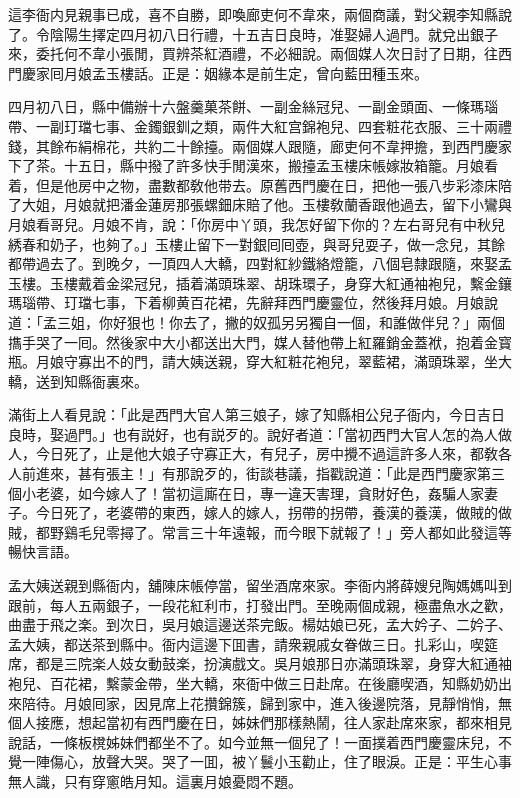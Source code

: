 這李衙内見親事已成，喜不自勝，即喚廊吏何不韋來，兩個商議，對父親李知縣說了。令陰陽生擇定四月初八日行禮，十五吉日良時，准娶婦人過門。就兌出銀子來，委托何不韋小張閒，買辨茶紅酒禮，不必細說。兩個媒人次日討了日期，往西門慶家囘月娘孟玉樓話。正是：姻緣本是前生定，曾向藍田種玉來。

四月初八日，縣中備辦十六盤羹菓茶餅、一副金絲冠兒、一副金頭面、一條瑪瑙帶、一副玎璫七事、金鐲銀釧之類，兩件大紅宫錦袍兒、四套粧花衣服、三十兩禮錢，其餘布絹棉花，共約二十餘擡。兩個媒人跟隨，廊吏何不韋押擔，到西門慶家下了茶。十五日，縣中撥了許多快手閒漢來，搬擡孟玉樓床帳嫁妝箱籠。月娘看着，但是他房中之物，盡數都敎他带去。原舊西門慶在日，把他一張八步彩漆床陪了大姐，月娘就把潘金蓮房那張螺鈿床賠了他。玉樓敎蘭香跟他過去，留下小鸞與月娘看哥兒。月娘不肯，說：「你房中丫頭，我怎好留下你的？左右哥兒有中秋兒綉春和奶子，也夠了。」玉樓止留下一對銀囘囘壺，與哥兒耍子，做一念兒，其餘都帶過去了。到晚夕，一頂四人大轎，四對紅紗鐵絡燈籠，八個皂隸跟隨，來娶孟玉樓。玉樓戴着金梁冠兒，插着滿頭珠翠、胡珠環子，身穿大紅通袖袍兒，繫金鑲瑪瑙帶、玎璫七事，下着柳黄百花裙，先辭拜西門慶靈位，然後拜月娘。月娘說道：「孟三姐，你好狠也！你去了，撇的奴孤另另獨自一個，和誰做伴兒？」兩個㩦手哭了一囘。然後家中大小都送出大門，媒人替他帶上紅羅銷金蓋袱，抱着金寳瓶。月娘守寡出不的門，請大姨送親，穿大紅粧花袍兒，翠藍裙，滿頭珠翠，坐大轎，送到知縣衙裏來。

滿街上人看見說：「此是西門大官人第三娘子，嫁了知縣相公兒子衙内，今日吉日良時，娶過門。」也有説好，也有説歹的。說好者道：「當初西門大官人怎的為人做人，今日死了，止是他大娘子守寡正大，有兒子，房中攪不過這許多人來，都敎各人前進來，甚有張主！」有那說歹的，街談巷議，指戳說道：「此是西門慶家第三個小老婆，如今嫁人了！當初這廝在日，專一違天害理，貪財好色，姦騙人家妻子。今日死了，老婆帶的東西，嫁人的嫁人，拐帶的拐帶，養漢的養漢，做賊的做賊，都野鷄毛兒零撏了。常言三十年遠報，而今眼下就報了！」旁人都如此發這等暢快言語。

孟大姨送親到縣衙内，舖陳床帳停當，留坐酒席來家。李衙内將薛嫂兒陶媽媽叫到跟前，每人五兩銀子，一段花紅利市，打發出門。至晚兩個成親，極盡魚水之歡，曲盡于飛之楽。到次日，吳月娘這邊送茶完飯。楊姑娘已死，孟大妗子、二妗子、孟大姨，都送茶到縣中。衙内這邊下囬書，請衆親戚女眷做三日。扎彩山，喫筵席，都是三院楽人妓女動鼓楽，扮演戲文。吳月娘那日亦滿頭珠翠，身穿大紅通袖袍兒、百花裙，繫蒙金帶，坐大轎，來衙中做三日赴席。在後廳喫酒，知縣奶奶出來陪待。月娘囘家，因見席上花攢錦簇，歸到家中，進入後邊院落，見靜悄悄，無個人接應，想起當初有西門慶在日，姊妹們那樣熱鬧，往人家赴席來家，都來相見說話，一條板櫈姊妹們都坐不了。如今並無一個兒了！一面撲着西門慶靈床兒，不覺一陣傷心，放聲大哭。哭了一囬，被丫鬟小玉勸止，住了眼淚。正是：平生心事無人識，只有穿窻皓月知。這裏月娘憂悶不題。

